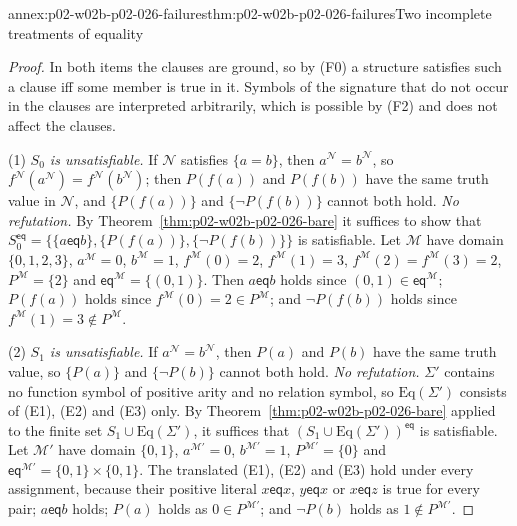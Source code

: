 \begin{annexitem}{annex:p02-w02b-p02-026-failures}{thm:p02-w02b-p02-026-failures}{Two incomplete treatments of equality}
\begin{proof}
In both items the clauses are ground, so by (F0) a structure satisfies such a
clause iff some member is true in it.  Symbols of the signature that do not
occur in the clauses are interpreted arbitrarily, which is possible by (F2)
and does not affect the clauses.

(1)  \emph{\(S_0\) is unsatisfiable.}  If \(\mathcal N\) satisfies
\(\{a=b\}\), then \(a^{\mathcal N}=b^{\mathcal N}\), so
\(f^{\mathcal N}(a^{\mathcal N})=f^{\mathcal N}(b^{\mathcal N})\); then
\(P(f(a))\) and \(P(f(b))\) have the same truth value in \(\mathcal N\), and
\(\{P(f(a))\}\) and \(\{\neg P(f(b))\}\) cannot both hold.  \emph{No
refutation.}  By Theorem~\ref{thm:p02-w02b-p02-026-bare} it suffices to show
that \(S_0^{\mathsf{eq}}=\bigl\{\{a\mathrel{\mathsf{eq}}b\},\{P(f(a))\},
\{\neg P(f(b))\}\bigr\}\) is satisfiable.  Let \(\mathcal M\) have domain
\(\{0,1,2,3\}\), \(a^{\mathcal M}=0\), \(b^{\mathcal M}=1\),
\(f^{\mathcal M}(0)=2\), \(f^{\mathcal M}(1)=3\),
\(f^{\mathcal M}(2)=f^{\mathcal M}(3)=2\), \(P^{\mathcal M}=\{2\}\) and
\(\mathsf{eq}^{\mathcal M}=\{(0,1)\}\).  Then \(a\mathrel{\mathsf{eq}}b\) holds
since \((0,1)\in\mathsf{eq}^{\mathcal M}\); \(P(f(a))\) holds since
\(f^{\mathcal M}(0)=2\in P^{\mathcal M}\); and \(\neg P(f(b))\) holds since
\(f^{\mathcal M}(1)=3\notin P^{\mathcal M}\).

(2)  \emph{\(S_1\) is unsatisfiable.}  If \(a^{\mathcal N}=b^{\mathcal N}\),
then \(P(a)\) and \(P(b)\) have the same truth value, so \(\{P(a)\}\) and
\(\{\neg P(b)\}\) cannot both hold.  \emph{No refutation.}  \(\Sigma'\)
contains no function symbol of positive arity and no relation symbol, so
\(\mathrm{Eq}(\Sigma')\) consists of (E1), (E2) and (E3) only.  By
Theorem~\ref{thm:p02-w02b-p02-026-bare} applied to the finite set
\(S_1\cup\mathrm{Eq}(\Sigma')\), it suffices that
\((S_1\cup\mathrm{Eq}(\Sigma'))^{\mathsf{eq}}\) is satisfiable.  Let
\(\mathcal M'\) have domain \(\{0,1\}\), \(a^{\mathcal M'}=0\),
\(b^{\mathcal M'}=1\), \(P^{\mathcal M'}=\{0\}\) and
\(\mathsf{eq}^{\mathcal M'}=\{0,1\}\times\{0,1\}\).  The translated (E1),
(E2) and (E3) hold under every assignment, because their positive literal
\(x\mathrel{\mathsf{eq}}x\), \(y\mathrel{\mathsf{eq}}x\) or
\(x\mathrel{\mathsf{eq}}z\) is true for every pair; \(a\mathrel{\mathsf{eq}}b\)
holds; \(P(a)\) holds as \(0\in P^{\mathcal M'}\); and \(\neg P(b)\) holds as
\(1\notin P^{\mathcal M'}\).
\end{proof}
\end{annexitem}

